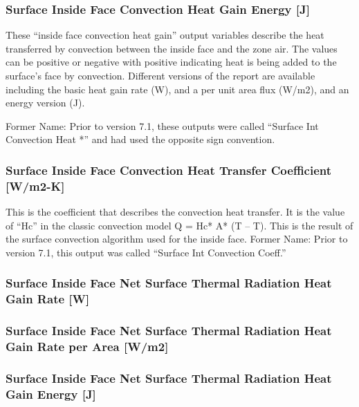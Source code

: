 \subsubsection{Surface Inside Face Convection Heat Gain Energy {[}J{]}}\label{surface-inside-face-convection-heat-gain-energy-j}

These ``inside face convection heat gain'' output variables describe the heat transferred by convection between the inside face and the zone air. The values can be positive or negative with positive indicating heat is being added to the surface's face by convection. Different versions of the report are available including the basic heat gain rate (W), and a per unit area flux (W/m2), and an energy version (J).

Former Name: Prior to version 7.1, these outputs were called ``Surface Int Convection Heat *'' and had used the opposite sign convention.

\subsubsection{Surface Inside Face Convection Heat Transfer Coefficient {[}W/m2-K{]}}\label{surface-inside-face-convection-heat-transfer-coefficient-wm2-k}

This is the coefficient that describes the convection heat transfer. It is the value of ``Hc'' in the classic convection model Q = Hc* A* (T -- T). This is the result of the surface convection algorithm used for the inside face. Former Name: Prior to version 7.1, this output was called ``Surface Int Convection Coeff.''

\subsubsection{Surface Inside Face Net Surface Thermal Radiation Heat Gain Rate {[}W{]}}\label{surface-inside-face-net-surface-thermal-radiation-heat-gain-rate-w}

\subsubsection{Surface Inside Face Net Surface Thermal Radiation Heat Gain Rate per Area {[}W/m2{]}}\label{surface-inside-face-net-surface-thermal-radiation-heat-gain-rate-per-area-wm2}

\subsubsection{Surface Inside Face Net Surface Thermal Radiation Heat Gain Energy {[}J{]}}\label{surface-inside-face-net-surface-thermal-radiation-heat-gain-energy-j}

